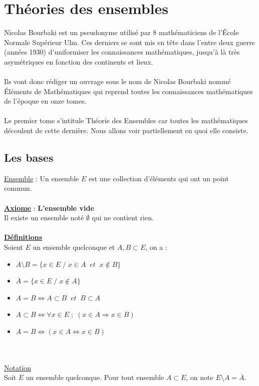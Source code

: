 \documentclass{report}
\begin{document}
\chapter{Théories des ensembles}
Nicolas Bourbaki est un pseudonyme utilisé par 8 mathématiciens de l’École Normale Supérieur Ulm. Ces derniers se sont mis en tête dans l’entre deux guerre (années 1930) d’uniformiser les connaissances mathématiques, jusqu’à là très asymétriques en fonction des continents et lieux. \\ \\
Ils vont donc rédiger un ouvrage sous le nom de Nicolas Bourbaki nommé Éléments de Mathématiques qui reprend toutes les connaissances mathématiques de l’époque en onze tomes. \\ \\
Le premier tome s’intitule Théorie des Ensembles car toutes les mathématiques découlent de cette dernière. Nous allons voir partiellement en quoi elle consiste.

\section{Les bases}

\underline{Ensemble} : Un ensemble $E$ est une collection d’éléments qui ont un point commun. \\ \\
\textbf{\underline{Axiome}} : \quad \textbf{L'ensemble vide} \\
Il existe un ensemble noté $\emptyset$ qui ne contient rien. \\ \\
\textbf{\underline{Définitions}} \\
Soient $E$ un ensemble quelconque et $A, B \subset E$, on a :
\begin{itemize}
    \item $A \setminus B = \{ x \in E \; / \; x\in A \; \;  et \; \;  x \notin B \}$
    \item $\overline{A} = \{ x \in E \; / \; x \notin A \}$
    \item $A = B \Leftrightarrow A \subset B \; \; et \; \; B \subset A$
    \item $A \subset B \Leftrightarrow \forall x \in E \; ; \; (x \in A \Rightarrow x \in B)$
    \item $A = B \Leftrightarrow (x \in A \Leftrightarrow x \in B)$
\end{itemize} \\ \\
\underline{Notation} \\
Soit $E$ un ensemble quelconque. Pour tout ensemble $A \subset E$, on note $E \setminus A = \overline{A}$. \\
\end{document}
